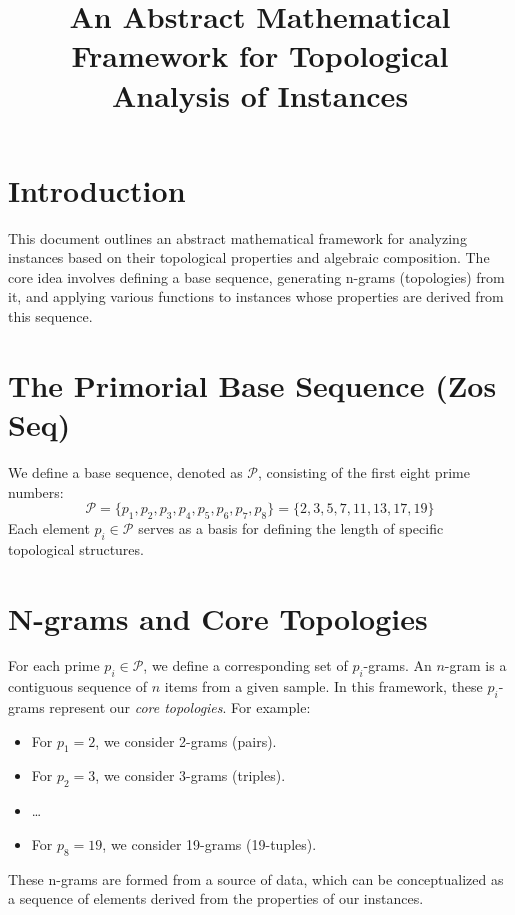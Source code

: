 \documentclass{article}
\title{An Abstract Mathematical Framework for Topological Analysis of Instances}
\author{}
\date{}
\begin{document}
\maketitle

\section{Introduction}
This document outlines an abstract mathematical framework for analyzing instances based on their topological properties and algebraic composition. The core idea involves defining a base sequence, generating n-grams (topologies) from it, and applying various functions to instances whose properties are derived from this sequence.

\section{The Primorial Base Sequence (Zos Seq)}
We define a base sequence, denoted as $\mathcal{P}$, consisting of the first eight prime numbers:
\[ \mathcal{P} = \{p_1, p_2, p_3, p_4, p_5, p_6, p_7, p_8\} = \{2, 3, 5, 7, 11, 13, 17, 19\} \]
Each element $p_i \in \mathcal{P}$ serves as a basis for defining the length of specific topological structures.

\section{N-grams and Core Topologies}
For each prime $p_i \in \mathcal{P}$, we define a corresponding set of $p_i$-grams. An $n$-gram is a contiguous sequence of $n$ items from a given sample. In this framework, these $p_i$-grams represent our \textit{core topologies}.
For example:
\begin{itemize}
    
    \item For $p_1 = 2$, we consider 2-grams (pairs).
    
    \item For $p_2 = 3$, we consider 3-grams (triples).
    
    \item \ldots
    
    \item For $p_8 = 19$, we consider 19-grams (19-tuples).
\end{itemize}
These n-grams are formed from a source of data, which can be conceptualized as a sequence of elements derived from the properties of our instances.
\end{document}
